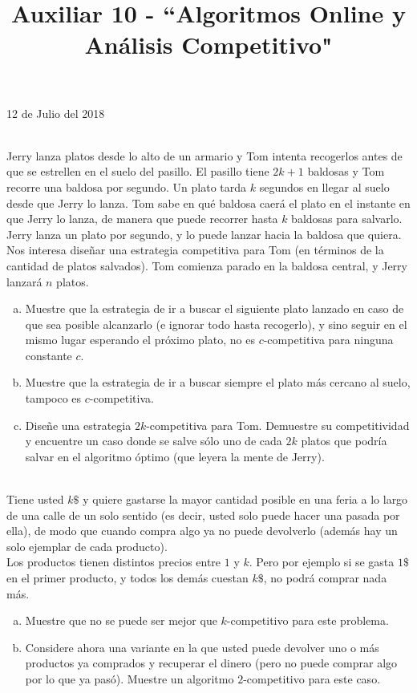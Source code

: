 \documentclass[dcc,uchile]{fcfmcourse}
\title{Auxiliar 10 - ``Algoritmos Online y Análisis Competitivo"}
\theoremstyle{plain}
\theoremstyle{definition}
\begin{document}
\maketitle
\begin{center}
12 de Julio del 2018
\end{center}


\vspace{-1ex}


\begin{problems}
\\
Jerry lanza platos desde lo alto de un armario y Tom intenta recogerlos antes de que se estrellen en el suelo del pasillo. El pasillo tiene $2k + 1$ baldosas y Tom recorre una baldosa por segundo. Un plato tarda $k$ segundos en llegar al suelo desde que Jerry lo lanza. Tom sabe en qué baldosa caerá el plato en el instante
en que Jerry lo lanza, de manera que puede recorrer hasta $k$ baldosas para salvarlo. Jerry lanza un plato por segundo, y lo puede lanzar hacia la baldosa que quiera.
Nos interesa diseñar una estrategia competitiva para Tom (en términos de la cantidad de platos salvados). Tom comienza parado en la baldosa central, y Jerry lanzará $n$ platos.
\begin{enumerate}[a)]
    \item Muestre que la estrategia de ir a buscar el siguiente plato lanzado en caso de que sea posible alcanzarlo (e ignorar todo hasta recogerlo), y sino seguir en el mismo lugar esperando el próximo plato, no es $c$-competitiva para ninguna constante $c$.
    \item Muestre que la estrategia de ir a buscar siempre el plato más cercano al suelo, tampoco es $c$-competitiva.
    \item Diseñe una estrategia $2k$-competitiva para Tom. Demuestre su competitividad y encuentre un caso donde se salve sólo uno de cada $2k$ platos que podría salvar en el algoritmo óptimo (que leyera la mente de Jerry).
\end{enumerate}
\\
Tiene usted $k\$$ y quiere gastarse la mayor cantidad posible en una feria a lo largo de una calle de un solo sentido (es decir, usted solo puede hacer una pasada por ella), de modo que cuando compra algo ya no puede devolverlo (además hay un solo ejemplar de cada producto).\\ Los productos tienen
distintos precios entre $1$ y $k$. Pero por ejemplo si se gasta $1\$$ en el primer producto, y todos los demás cuestan $k\$$, no podrá comprar nada más. 
\begin{enumerate}[a)]
    \item Muestre que no se puede ser mejor que $k$-competitivo para este problema.
    \item Considere ahora una variante en la que usted puede devolver uno o más productos ya comprados y recuperar el dinero (pero no puede comprar algo por lo que ya pasó). Muestre un algoritmo $2$-competitivo para este caso.
\end{enumerate}
\end{problems}
\end{document}
